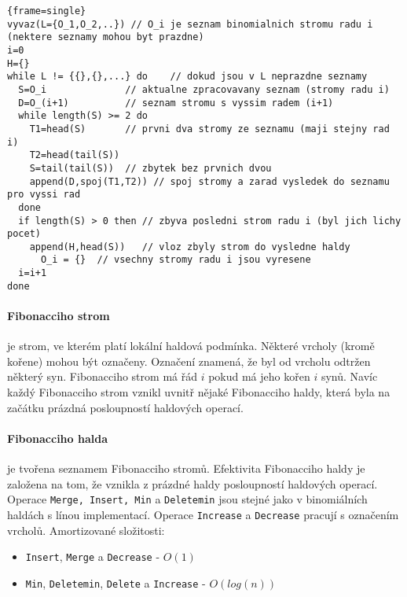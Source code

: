 \documentclass[a4paper]{article}      %
\begin{document}
\lstset{
	basicstyle=\small,
	stringstyle=\ttfamily,
	columns=fixed,
	basewidth=0.50em,
	breaklines=true,
	breakautoindent=true}
\begin{lstlisting}{frame=single}
vyvaz(L={O_1,O_2,..}) // O_i je seznam binomialnich stromu radu i (nektere seznamy mohou byt prazdne)
i=0
H={}
while L != {{},{},...} do    // dokud jsou v L neprazdne seznamy
  S=O_i              // aktualne zpracovavany seznam (stromy radu i)
  D=O_(i+1)          // seznam stromu s vyssim radem (i+1)
  while length(S) >= 2 do
    T1=head(S)       // prvni dva stromy ze seznamu (maji stejny rad i)
    T2=head(tail(S))
    S=tail(tail(S))  // zbytek bez prvnich dvou
    append(D,spoj(T1,T2)) // spoj stromy a zarad vysledek do seznamu pro vyssi rad
  done
  if length(S) > 0 then // zbyva posledni strom radu i (byl jich lichy pocet)
    append(H,head(S))   // vloz zbyly strom do vysledne haldy
	  O_i = {}  // vsechny stromy radu i jsou vyresene
  i=i+1
done 
\end{lstlisting}

\paragraph{Fibonacciho strom} je strom, ve kterém platí lokální haldová podmínka. Některé vrcholy (kromě kořene) mohou být označeny.
Označení znamená, že byl od vrcholu odtržen některý syn. Fibonacciho strom má řád $i$ pokud má jeho kořen $i$ synů.
Navíc každý Fibonacciho strom vznikl uvnitř nějaké Fibonacciho haldy, která byla na začátku prázdná posloupností haldových operací.

\paragraph{Fibonacciho halda} je tvořena seznamem Fibonacciho stromů.
Efektivita Fibonacciho haldy je založena na tom, že vznikla z prázdné haldy posloupností haldových operací.
Operace \verb+Merge, Insert, Min+ a \verb+Deletemin+ jsou stejné jako v binomiálních haldách s línou implementací.
Operace \verb+Increase+ a \verb+Decrease+ pracují s označením vrcholů. Amortizované složitosti:
\begin{itemize}
\item \verb+Insert+, \verb+Merge+ a \verb+Decrease+ - $O(1)$
\item \verb+Min+, \verb+Deletemin+, \verb+Delete+ a \verb+Increase+ - $O(log(n))$
\end{itemize}
\end{document}
